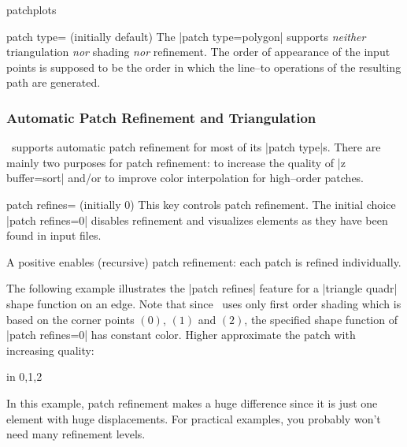 {\begin{pgfplotslibrary}{patchplots}
\begin{pgfplotskey}{patch type= (initially default)}
	The |patch type=polygon| supports \emph{neither} triangulation \emph{nor} shading \emph{nor} refinement. The order of appearance of the input points is supposed to be the order in which the line--to operations of the resulting path are generated.

\end{pgfplotskey}



\subsubsection{Automatic Patch Refinement and Triangulation}
\label{sec:lib:patchplots:refinement}
\PGFPlots\ supports automatic patch refinement for most of its |patch type|s. There are mainly two purposes for patch refinement: to increase the quality of |z buffer=sort| and/or to improve color interpolation for high--order patches. 

\begin{pgfplotskey}{patch refines= (initially 0)}
	This key controls patch refinement. The initial choice |patch refines=0| disables refinement and visualizes elements as they have been found in input files.

	A positive  enables (recursive) patch refinement: each patch is refined individually. 

	The following example illustrates the |patch refines| feature for a |triangle quadr| shape function on an edge. Note that since \PGFPlots\ uses only first order shading which is based on the corner points $(0)$, $(1)$ and $(2)$, the specified shape function of |patch refines=0| has constant color. Higher  approximate the patch with increasing quality:
\begin{codeexample}[]
\foreach \level in {0,1,2} {%
}
\end{codeexample}
	\noindent In this example, patch refinement makes a huge difference since it is just one element with huge displacements. For practical examples, you probably won't need many refinement levels.
	

\end{pgfplotskey}
\end{pgfplotslibrary}}
